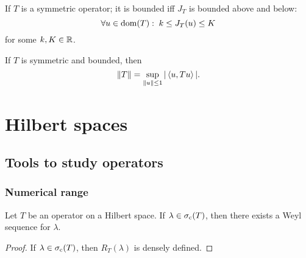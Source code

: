 \begin{corollary}
If $T$ is a symmetric operator; it is bounded iff $J_T$ is bounded above and below:
\[ \forall u\in\operatorname{dom}(T): \; k \leq J_T(u) \leq K \]
for some $k,K\in \mathbb{R}$.
\end{corollary}
\begin{corollary}
If $T$ is symmetric and bounded, then
\[ \lVert T\rVert = \sup_{\lVert u\rVert\leq 1} |\left\langle u,Tu \right\rangle|. \]
\end{corollary}






\chapter{Hilbert spaces}

\section{Tools to study operators}
\subsection{Numerical range}
\begin{lemma}
Let $T$ be an operator on a Hilbert space. If $\lambda\in\sigma_\text{c}(T)$, then there exists a Weyl sequence for $\lambda$. 
\end{lemma}
\begin{proof}
If $\lambda\in\sigma_\text{c}(T)$, then $R_T(\lambda)$ is densely defined.
\end{proof}


